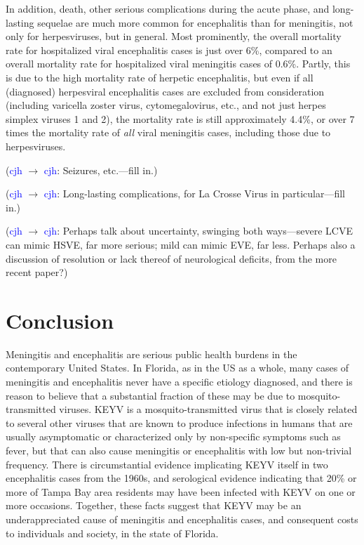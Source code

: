 \documentclass[12pt]{article}
\newcommand{\cjh}{\textcolor{blue}{cjh}}
\newcommand{\msg}[3]{(#1 $\rightarrow$ #2: #3)}
\newcommand{\mcc}[1]{\msg\cjh\cjh{#1}}
\begin{document}
            In addition, death, other serious complications during the acute phase, and long-lasting sequelae are much more common for encephalitis than for meningitis, not only for herpesviruses, but in general. Most prominently, the overall mortality rate for hospitalized viral encephalitis cases is just over 6\%\cite{george2014encephalitis}, compared to an overall mortality rate for hospitalized viral meningitis cases of 0.6\%\cite{holmquist2008meningitis}. Partly, this is due to the high mortality rate of herpetic encephalitis, but even if all (diagnosed) herpesviral encephalitis cases are excluded from consideration (including varicella zoster virus, cytomegalovirus, etc., and not just herpes simplex viruses 1 and 2), the mortality rate is still approximately 4.4\%, or over 7 times the mortality rate of \textit{all} viral meningitis cases, including those due to herpesviruses.

            \mcc{Seizures, etc.---fill in.}
            
            \mcc{Long-lasting complications, for La Crosse Virus in particular---fill in.}
            
            \mcc{Perhaps talk about uncertainty, swinging both ways---severe LCVE can mimic HSVE, far more serious; mild can mimic EVE, far less. Perhaps also a discussion of resolution or lack thereof of neurological deficits, from the more recent paper?}

    \section{Conclusion}
        \label{conclusion}
        Meningitis and encephalitis are serious public health burdens in the contemporary United States. In Florida, as in the US as a whole, many cases of meningitis and encephalitis never have a specific etiology diagnosed, and there is reason to believe that a substantial fraction of these may be due to mosquito-transmitted viruses. KEYV is a mosquito-transmitted virus that is closely related to several other viruses that are known to produce infections in humans that are usually asymptomatic or characterized only by non-specific symptoms such as fever, but that can also cause meningitis or encephalitis with low but non-trivial frequency. There is circumstantial evidence implicating KEYV itself in two encephalitis cases from the 1960s, and serological evidence indicating that 20\% or more of Tampa Bay area residents may have been infected with KEYV on one or more occasions. Together, these facts suggest that KEYV may be an underappreciated cause of meningitis and encephalitis cases, and consequent costs to individuals and society, in the state of Florida.
\end{document}
